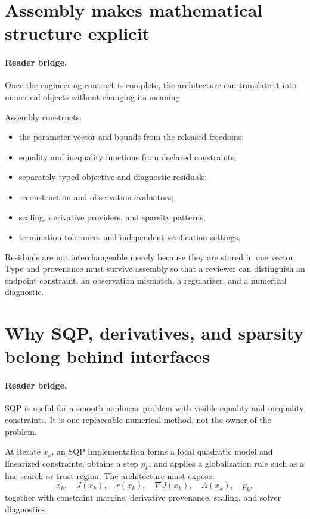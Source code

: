 \section{Assembly makes mathematical structure explicit}

\paragraph{Reader bridge.}
Once the engineering contract is complete, the architecture can translate it
into numerical objects without changing its meaning.

Assembly constructs:
\begin{itemize}
\item the parameter vector and bounds from the released freedoms;
\item equality and inequality functions from declared constraints;
\item separately typed objective and diagnostic residuals;
\item reconstruction and observation evaluators;
\item scaling, derivative providers, and sparsity patterns;
\item termination tolerances and independent verification settings.
\end{itemize}

Residuals are not interchangeable merely because they are stored in one
vector. Type and provenance must survive assembly so that a reviewer can
distinguish an endpoint constraint, an observation mismatch, a regularizer,
and a numerical diagnostic.

\section{Why SQP, derivatives, and sparsity belong behind interfaces}

\paragraph{Reader bridge.}
SQP is useful for a smooth nonlinear problem with visible equality and
inequality constraints. It is one replaceable numerical method, not the
owner of the problem.

At iterate \(x_k\), an SQP implementation forms a local quadratic model and
linearized constraints, obtains a step \(p_k\), and applies a globalization
rule such as a line search or trust region. The architecture must expose:
\[
x_k,\quad J(x_k),\quad r(x_k),\quad
\nabla J(x_k),\quad A(x_k),\quad p_k,
\]
together with constraint margins, derivative provenance, scaling, and solver
diagnostics.


